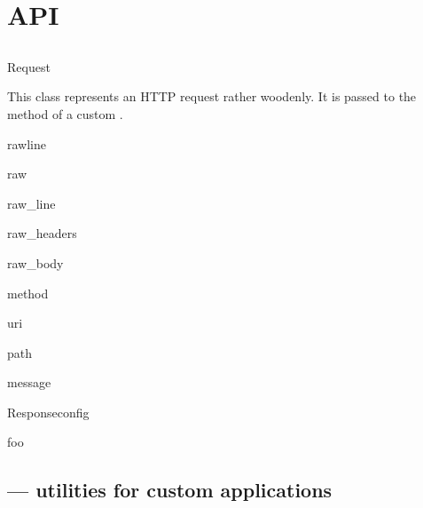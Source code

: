 \chapter{API}

\section{}

\begin{classdesc}{Request}{}

This class represents an HTTP request rather woodenly. It is passed to the
 method of a custom .

rawline

raw

raw_line

raw_headers

raw_body

method

uri

path

message



\end{classdesc}



\begin{classdesc}{Response}{config}

foo
\end{classdesc}


\section{ --- utilities for custom applications}


\section{}

\section{}

\section{}


